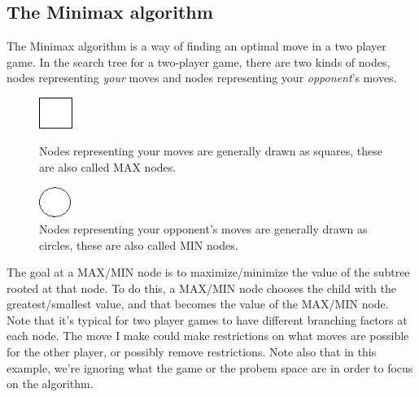 \subsection{The Minimax algorithm}
The Minimax algorithm is a way of finding an optimal move in a two player game. In the search tree for a two-player game, there are two kinds of nodes, nodes representing \textit{your} moves and nodes representing your \textit{opponent}'s moves.\cite{graphics_minimax}
\begin{figure}[H]
\centering
	\begin{minipage}[b]{0.45\linewidth}
		\centering
		\includegraphics[height=1cm]{2_State_of_the_art/Arimaa_on_MCTS_Benoit/img/max.png}
		\caption{\label{fig:max}Nodes representing your moves are generally drawn as squares, these are also called MAX nodes.}
	\end{minipage}%
	\hspace*{1cm}
	\begin{minipage}[b]{0.45\linewidth}
		\centering
		\includegraphics[height=1cm]{2_State_of_the_art/Arimaa_on_MCTS_Benoit/img/min.png}
		\caption{\label{fig:min}Nodes representing your opponent's moves are generally drawn as circles, these are also called MIN nodes.}
	\end{minipage}%
\end{figure}
\noindent
The goal at a MAX/MIN node is to maximize/minimize the value of the subtree rooted at that node. To do this, a MAX/MIN node chooses the child with the greatest/smallest value, and that becomes the value of the MAX/MIN node.\\
Note that it's typical for two player games to have different branching factors at each node. The move I make could make restrictions on what moves are possible for the other player, or possibly remove restrictions. Note also that in this example, we're ignoring what the game or the probem space are in order to focus on the algorithm.

